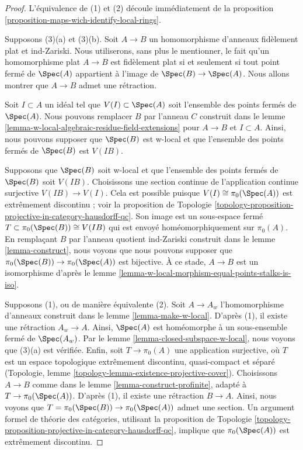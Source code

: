 \begin{proof}
L'équivalence de (1) et (2) découle immédiatement de la
proposition \ref{proposition-maps-wich-identify-local-rings}.

\medskip\noindent
Supposons (3)(a) et (3)(b). Soit $A \to B$ un homomorphisme d'anneaux fidèlement plat et ind-Zariski.
Nous utiliserons, sans plus le mentionner, le fait qu'un homomorphisme plat
$A \to B$ est fidèlement plat si et seulement si tout point fermé
de $\Spec(A)$ appartient à l'image de $\Spec(B) \to \Spec(A)$.
Nous allons montrer que $A \to B$ admet une rétraction.

\medskip\noindent
Soit $I \subset A$ un idéal tel que $V(I) \subset \Spec(A)$ soit
l'ensemble des points fermés de $\Spec(A)$.
Nous pouvons remplacer $B$ par l'anneau $C$ construit dans le
lemme \ref{lemma-w-local-algebraic-residue-field-extensions}
pour $A \to B$ et $I \subset A$.
Ainsi, nous pouvons supposer que $\Spec(B)$ est w-local et que l'ensemble des
points fermés de $\Spec(B)$ est $V(IB)$.

\medskip\noindent
Supposons que $\Spec(B)$ soit w-local et que l'ensemble des points fermés de $\Spec(B)$
soit $V(IB)$. Choisissons une section continue de l'application
continue surjective $V(IB) \to V(I)$. Cela est possible puisque
$V(I) \cong \pi_0(\Spec(A))$ est extrêmement discontinu ; voir la
proposition de Topologie
\ref{topology-proposition-projective-in-category-hausdorff-qc}.
Son image est un sous-espace fermé $T \subset \pi_0(\Spec(B)) \cong V(IB)$
qui est envoyé homéomorphiquement sur $\pi_0(A)$. En remplaçant $B$ par l'anneau quotient ind-Zariski
construit dans le lemme \ref{lemma-construct},
nous voyons que nous pouvons supposer que $\pi_0(\Spec(B)) \to \pi_0(\Spec(A))$
est bijective. À ce stade, $A \to B$ est un isomorphisme d'après le
lemme \ref{lemma-w-local-morphism-equal-points-stalks-is-iso}.

\medskip\noindent
Supposons (1), ou de manière équivalente (2). Soit $A \to A_w$ l'homomorphisme d'anneaux construit dans le
lemme \ref{lemma-make-w-local}. D'après (1), il existe une rétraction $A_w \to A$.
Ainsi, $\Spec(A)$ est homéomorphe à un sous-ensemble fermé de $\Spec(A_w)$. Par le
lemme \ref{lemma-closed-subspace-w-local}, nous voyons que (3)(a) est vérifiée.
Enfin, soit $T \to \pi_0(A)$ une application surjective, où $T$ est un espace topologique
extrêmement discontinu, quasi-compact et séparé
(Topologie, lemme \ref{topology-lemma-existence-projective-cover}).
Choisissons $A \to B$ comme dans le lemme \ref{lemma-construct-profinite},
adapté à $T \to \pi_0(\Spec(A))$. D'après (1), il existe une rétraction
$B \to A$. Ainsi, nous voyons que $T = \pi_0(\Spec(B)) \to \pi_0(\Spec(A))$
admet une section. Un argument formel de théorie des catégories, utilisant la
proposition de Topologie
\ref{topology-proposition-projective-in-category-hausdorff-qc},
implique que $\pi_0(\Spec(A))$ est extrêmement discontinu.
\end{proof}

